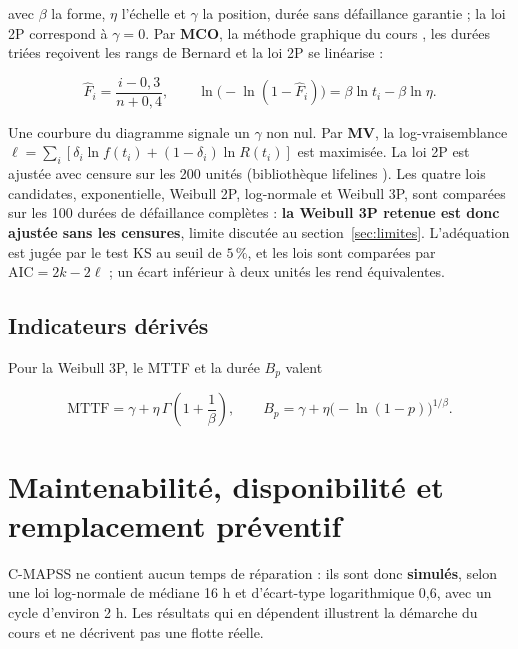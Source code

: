 avec $\beta$ la forme, $\eta$ l'échelle et $\gamma$ la position, durée sans défaillance garantie ; la loi 2P correspond à $\gamma = 0$. Par \textbf{MCO}, la méthode graphique du cours \cite{benhmida}, les durées triées reçoivent les rangs de Bernard \cite{bernard1953} et la loi 2P se linéarise :

\begin{equation}\label{eq:bernard}
\hat F_i = \frac{i - 0{,}3}{n + 0{,}4}, \qquad \ln\!\big(-\ln(1-\hat F_i)\big) = \beta \ln t_i - \beta \ln \eta .
\end{equation}

Une courbure du diagramme signale un $\gamma$ non nul. Par \textbf{MV}, la log-vraisemblance $\ell = \sum_i [\delta_i \ln f(t_i) + (1-\delta_i) \ln R(t_i)]$ est maximisée. La loi 2P est ajustée avec censure sur les 200 unités (bibliothèque lifelines \cite{davidsonpilon2019}). Les quatre lois candidates, exponentielle, Weibull 2P, log-normale et Weibull 3P, sont comparées sur les 100 durées de défaillance complètes : \textbf{la Weibull 3P retenue est donc ajustée sans les censures}, limite discutée au section~\ref{sec:limites}. L'adéquation est jugée par le test KS au seuil de $5\,\%$, et les lois sont comparées par $\mathrm{AIC} = 2k - 2\ell$ ; un écart inférieur à deux unités les rend équivalentes.

\subsection{Indicateurs dérivés}

Pour la Weibull 3P, le MTTF et la durée $B_p$ valent

\begin{equation}\label{eq:mttf}
\mathrm{MTTF} = \gamma + \eta\, \Gamma\!\left(1 + \frac{1}{\beta}\right), \qquad B_p = \gamma + \eta \big(-\ln(1-p)\big)^{1/\beta}.
\end{equation}

\section{Maintenabilité, disponibilité et remplacement préventif}\label{sec:fmds02}

C-MAPSS ne contient aucun temps de réparation : ils sont donc \textbf{simulés}, selon une loi log-normale de médiane 16 h et d'écart-type logarithmique 0,6, avec un cycle d'environ 2 h. Les résultats qui en dépendent illustrent la démarche du cours et ne décrivent pas une flotte réelle.

